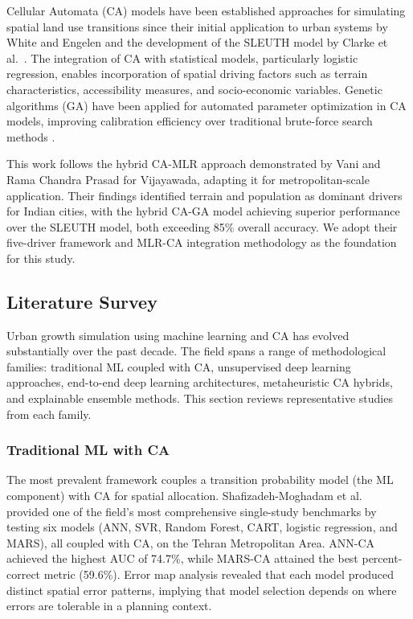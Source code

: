 \documentclass[12pt,a4paper]{article}
\begin{document}
Cellular Automata (CA) models have been established approaches for simulating spatial land use transitions since their initial application to urban systems by White and Engelen \cite{white1993} and the development of the SLEUTH model by Clarke et al.\ \cite{clarke1997}. The integration of CA with statistical models, particularly logistic regression, enables incorporation of spatial driving factors such as terrain characteristics, accessibility measures, and socio-economic variables. Genetic algorithms (GA) have been applied for automated parameter optimization in CA models, improving calibration efficiency over traditional brute-force search methods \cite{wu2002, goldberg1989}.

This work follows the hybrid CA-MLR approach demonstrated by Vani and Rama Chandra Prasad \cite{vani2022} for Vijayawada, adapting it for metropolitan-scale application. Their findings identified terrain and population as dominant drivers for Indian cities, with the hybrid CA-GA model achieving superior performance over the SLEUTH model, both exceeding 85\% overall accuracy. We adopt their five-driver framework and MLR-CA integration methodology as the foundation for this study.

\subsection{Literature Survey}
Urban growth simulation using machine learning and CA has evolved substantially over the past decade. The field spans a range of methodological families: traditional ML coupled with CA, unsupervised deep learning approaches, end-to-end deep learning architectures, metaheuristic CA hybrids, and explainable ensemble methods. This section reviews representative studies from each family.

\subsubsection{Traditional ML with CA}
The most prevalent framework couples a transition probability model (the ML component) with CA for spatial allocation. Shafizadeh-Moghadam et al.\ \cite{shafizadeh2017} provided one of the field's most comprehensive single-study benchmarks by testing six models (ANN, SVR, Random Forest, CART, logistic regression, and MARS), all coupled with CA, on the Tehran Metropolitan Area. ANN-CA achieved the highest AUC of 74.7\%, while MARS-CA attained the best percent-correct metric (59.6\%). Error map analysis revealed that each model produced distinct spatial error patterns, implying that model selection depends on where errors are tolerable in a planning context.
\end{document}
